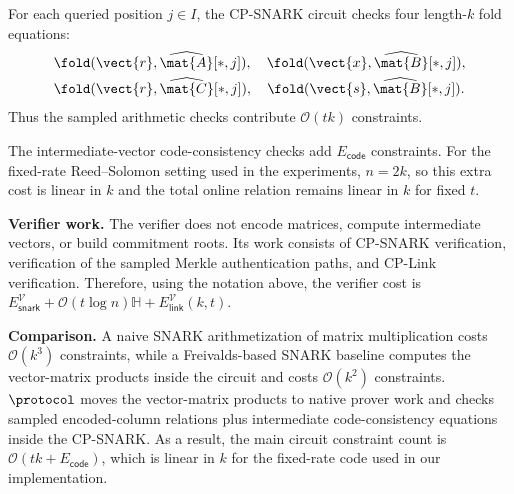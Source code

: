 For each queried position \(j\in I\), the CP-SNARK circuit checks four
length-\(k\) fold equations:
\[
\begin{aligned}
  &\fold(\vect{r},\widehat{\mat{A}}[*,j]),\quad
  \fold(\vect{x},\widehat{\mat{B}}[*,j]),\\
  &\fold(\vect{r},\widehat{\mat{C}}[*,j]),\quad
  \fold(\vect{s},\widehat{\mat{B}}[*,j]).
\end{aligned}
\]
Thus the sampled arithmetic checks contribute \(\mathcal{O}(tk)\) constraints. 

The intermediate-vector code-consistency checks add
\(E_{\mathsf{code}}\) constraints. For the fixed-rate
Reed--Solomon setting used in the experiments, \(n=2k\), so this extra cost is
linear in \(k\) and the total online relation remains linear in \(k\) for fixed
\(t\).

\noindent\textbf{Verifier work.}
The verifier does not encode matrices, compute intermediate vectors, or build
commitment roots.  Its work consists of CP-SNARK verification, verification of
the sampled Merkle authentication paths, and CP-Link verification.  Therefore,
using the notation above, the verifier cost is
$E_{\mathsf{snark}}^\mathcal{V} + \mathcal{O}(t\log n)\mathbb{H} +
E_{\mathsf{link}}^\mathcal{V}(k,t)$.

\noindent\textbf{Comparison.}
A naive SNARK arithmetization of matrix multiplication costs
\(\mathcal{O}(k^3)\) constraints, while a Freivalds-based SNARK baseline computes
the vector-matrix products inside the circuit and costs \(\mathcal{O}(k^2)\) constraints.  
\(\protocol\) moves the vector-matrix products to native prover work and checks
sampled encoded-column relations plus intermediate code-consistency equations
inside the CP-SNARK.
As a result, the main circuit constraint count is
\(\mathcal{O}(tk+E_{\mathsf{code}})\), which is linear in \(k\) for the
fixed-rate code used in our implementation.
